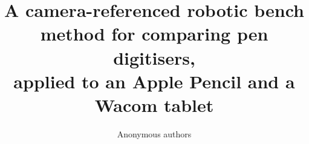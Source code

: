 \documentclass[11pt,a4paper]{article}
\title{A camera-referenced robotic bench method for comparing pen digitisers,\\ applied to an Apple Pencil and a Wacom tablet}
\author{Anonymous authors}
\date{}
\begin{document}
\maketitle
\linenumbers











\end{document}
